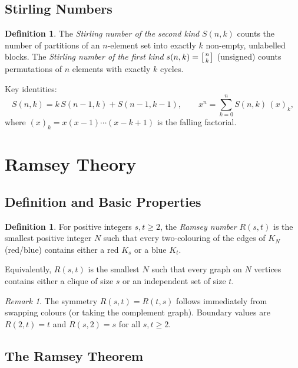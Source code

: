 \documentclass[12pt,a4paper]{amsart}
\theoremstyle{definition}
\newtheorem{definition}[theorem]{Definition}
\theoremstyle{remark}
\newtheorem{remark}[theorem]{Remark}
\begin{document}
\subsection{Stirling Numbers}

\begin{definition}
The \emph{Stirling number of the second kind} $S(n,k)$ counts the number of
partitions of an $n$-element set into exactly $k$ non-empty, unlabelled blocks.
The \emph{Stirling number of the first kind} $s(n,k) = \left[{n\atop k}\right]$
(unsigned) counts permutations of $n$ elements with exactly $k$ cycles.
\end{definition}

Key identities:
\[
  S(n,k) = k\,S(n-1,k) + S(n-1,k-1), \qquad
  x^n = \sum_{k=0}^{n} S(n,k)\,(x)_k,
\]
where $(x)_k = x(x-1)\cdots(x-k+1)$ is the falling factorial.

\section{Ramsey Theory}

\subsection{Definition and Basic Properties}

\begin{definition}\label{def:ramsey-number}
For positive integers $s, t \ge 2$, the \emph{Ramsey number} $R(s,t)$ is the
smallest positive integer $N$ such that every two-colouring of the edges of $K_N$
(red/blue) contains either a red $K_s$ or a blue $K_t$.
\end{definition}

Equivalently, $R(s,t)$ is the smallest $N$ such that every graph on $N$ vertices
contains either a clique of size $s$ or an independent set of size $t$.

\begin{remark}
The symmetry $R(s,t) = R(t,s)$ follows immediately from swapping colours (or taking
the complement graph).  Boundary values are $R(2,t) = t$ and $R(s,2) = s$ for all
$s,t \ge 2$.
\end{remark}

\subsection{The Ramsey Theorem}
\end{document}
